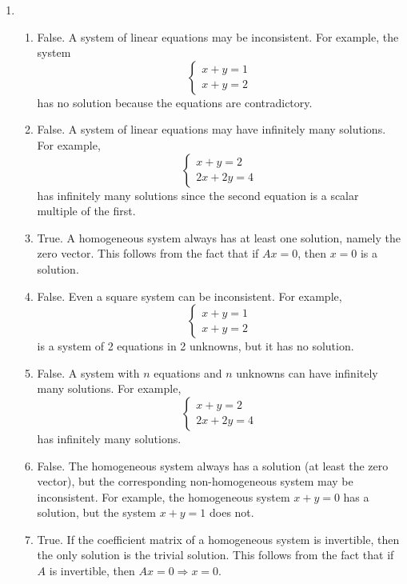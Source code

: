 \documentclass[12pt]{article}
\begin{document}
\begin{enumerate}
\item
\begin{enumerate}
    \item False. A system of linear equations may be inconsistent. For example, the system
    \[
    \begin{cases}
    x + y = 1 \\
    x + y = 2
    \end{cases}
    \]
    has no solution because the equations are contradictory.
    
    \item False. A system of linear equations may have infinitely many solutions. For example,
    \[
    \begin{cases}
    x + y = 2 \\
    2x + 2y = 4
    \end{cases}
    \]
    has infinitely many solutions since the second equation is a scalar multiple of the first.

    \item True. A homogeneous system always has at least one solution, namely the zero vector. This follows from the fact that if \( Ax = 0 \), then \( x = 0 \) is a solution.

    \item False. Even a square system can be inconsistent. For example,
    \[
    \begin{cases}
    x + y = 1 \\
    x + y = 2
    \end{cases}
    \]
    is a system of 2 equations in 2 unknowns, but it has no solution.

    \item False. A system with \( n \) equations and \( n \) unknowns can have infinitely many solutions. For example,
    \[
    \begin{cases}
    x + y = 2 \\
    2x + 2y = 4
    \end{cases}
    \]
    has infinitely many solutions.

    \item False. The homogeneous system always has a solution (at least the zero vector), but the corresponding non-homogeneous system may be inconsistent. For example, the homogeneous system \( x + y = 0 \) has a solution, but the system \( x + y = 1 \) does not.

    \item True. If the coefficient matrix of a homogeneous system is invertible, then the only solution is the trivial solution. This follows from the fact that if \( A \) is invertible, then \( Ax = 0 \Rightarrow x = 0 \).


\end{enumerate}
\end{enumerate}
\end{document}
